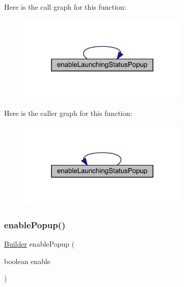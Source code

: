 Here is the call graph for this function\+:\nopagebreak
\begin{figure}[H]
\begin{center}
\leavevmode
\includegraphics[width=229pt]{classcom_1_1toast_1_1android_1_1gamebase_1_1_gamebase_configuration_1_1_builder_a1012d5b14ba4676c15432cc45fd26488_cgraph}
\end{center}
\end{figure}
Here is the caller graph for this function\+:\nopagebreak
\begin{figure}[H]
\begin{center}
\leavevmode
\includegraphics[width=229pt]{classcom_1_1toast_1_1android_1_1gamebase_1_1_gamebase_configuration_1_1_builder_a1012d5b14ba4676c15432cc45fd26488_icgraph}
\end{center}
\end{figure}
\mbox{\label{classcom_1_1toast_1_1android_1_1gamebase_1_1_gamebase_configuration_1_1_builder_a5b53589024bfbfc126c7f621ee0c2722}} 
\subsubsection{\texorpdfstring{enable\+Popup()}{enablePopup()}}
{\footnotesize\ttfamily \hyperlink{classcom_1_1toast_1_1android_1_1gamebase_1_1_gamebase_configuration_1_1_builder}{Builder} enable\+Popup (\begin{DoxyParamCaption}\item[{boolean}]{enable }\end{DoxyParamCaption})}

